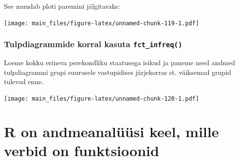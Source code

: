 \documentclass[]{book}
\newenvironment{Shaded}{\begin{snugshade}}{\end{snugshade}}
\newcommand{\KeywordTok}[1]{\textcolor[rgb]{0.13,0.29,0.53}{\textbf{#1}}}
\newcommand{\DataTypeTok}[1]{\textcolor[rgb]{0.13,0.29,0.53}{#1}}
\newcommand{\StringTok}[1]{\textcolor[rgb]{0.31,0.60,0.02}{#1}}
\newcommand{\OperatorTok}[1]{\textcolor[rgb]{0.81,0.36,0.00}{\textbf{#1}}}
\newcommand{\NormalTok}[1]{#1}
\begin{document}
See muudab ploti paremini jälgitavaks:

\begin{Shaded}
\end{Shaded}

\texttt{[image: main\_files/figure-latex/unnamed-chunk-119-1.pdf]}

\subsection{\texorpdfstring{Tulpdiagrammide korral kasuta
\texttt{fct\_infreq()}}{Tulpdiagrammide korral kasuta fct\_infreq()}}\label{tulpdiagrammide-korral-kasuta-fct_infreq}

Loeme kokku erineva perekondliku staatusega isikud ja paneme need andmed
tulpdiagrammi grupi suurusele vastupidises järjekorras st. väiksemad
grupid tulevad enne.

\begin{Shaded}
\end{Shaded}

\texttt{[image: main\_files/figure-latex/unnamed-chunk-120-1.pdf]}

\chapter{R on andmeanalüüsi keel, mille verbid on
funktsioonid}\label{funs}
\end{document}
